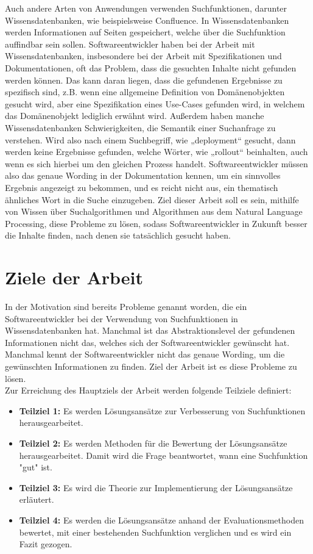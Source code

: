 Auch andere Arten von Anwendungen verwenden Suchfunktionen, darunter Wissensdatenbanken, wie beispielsweise Confluence.
In Wissensdatenbanken werden Informationen auf Seiten gespeichert, welche über die Suchfunktion auffindbar sein sollen.
Softwareentwickler haben bei der Arbeit mit Wissensdatenbanken, insbesondere bei der Arbeit mit Spezifikationen und Dokumentationen, oft das Problem, dass die gesuchten Inhalte nicht gefunden werden können.
Das kann daran liegen, dass die gefundenen Ergebnisse zu spezifisch sind, z.B. wenn eine allgemeine Definition von Domänenobjekten gesucht wird, aber eine Spezifikation eines Use-Cases gefunden wird, in welchem das Domänenobjekt lediglich erwähnt wird.
Außerdem haben manche Wissensdatenbanken Schwierigkeiten, die Semantik einer Suchanfrage zu verstehen.
Wird also nach einem Suchbegriff, wie „deployment“ gesucht, dann werden keine Ergebnisse gefunden, welche Wörter, wie „rollout“ beinhalten, auch wenn es sich hierbei um den gleichen Prozess handelt.
Softwareentwickler müssen also das genaue Wording in der Dokumentation kennen, um ein sinnvolles Ergebnis angezeigt zu bekommen, und es reicht nicht aus, ein thematisch ähnliches Wort in die Suche einzugeben.
Ziel dieser Arbeit soll es sein, mithilfe von Wissen über Suchalgorithmen und Algorithmen aus dem Natural Language Processing, diese Probleme zu lösen, sodass Softwareentwickler in Zukunft besser die Inhalte finden, nach denen sie tatsächlich gesucht haben.

\section{Ziele der Arbeit}
In der Motivation sind bereits Probleme genannt worden, die ein Softwareentwickler bei der Verwendung von Suchfunktionen in Wissensdatenbanken hat.
Manchmal ist das Abstraktionslevel der gefundenen Informationen nicht das, welches sich der Softwareentwickler gewünscht hat.
Manchmal kennt der Softwareentwickler nicht das genaue Wording, um die gewünschten Informationen zu finden.
Ziel der Arbeit ist es diese Probleme zu lösen.\\

Zur Erreichung des Hauptziels der Arbeit werden folgende Teilziele definiert:
\begin{itemize}
   \item \textbf{Teilziel 1:}
         Es werden Lösungsansätze zur Verbesserung von Suchfunktionen herausgearbeitet.
   \item \textbf{Teilziel 2:}
         Es werden Methoden für die Bewertung der Lösungsansätze herausgearbeitet.
         Damit wird die Frage beantwortet, wann eine Suchfunktion "gut" ist.
   \item \textbf{Teilziel 3:}
         Es wird die Theorie zur Implementierung der Lösungsansätze erläutert.
   \item \textbf{Teilziel 4:}
         Es werden die Lösungsansätze anhand der Evaluationsmethoden bewertet, mit einer bestehenden Suchfunktion verglichen und es wird ein Fazit gezogen.
\end{itemize}

